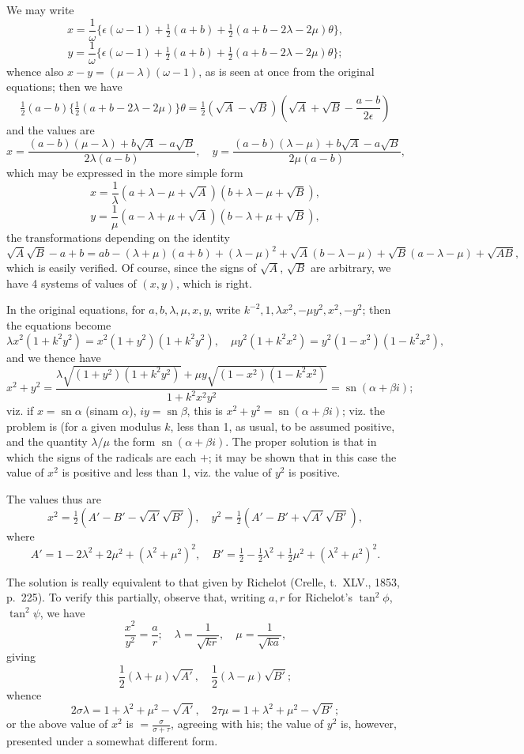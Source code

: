 \documentclass[11pt,a4paper]{book}
\begin{document}
\begin{solution}
We may write
\[
x = \frac{1}{\omega}\{\epsilon(\omega-1) + \tfrac{1}{2}(a+b) + \tfrac{1}{2}(a+b-2\lambda-2\mu)\theta\},
\]
\[
y = \frac{1}{\omega}\{\epsilon(\omega-1) + \tfrac{1}{2}(a+b) + \tfrac{1}{2}(a+b-2\lambda-2\mu)\theta\};
\]
whence also $x-y = (\mu-\lambda)(\omega-1)$, as is seen at once from the original equations; then we have
\[
\tfrac{1}{2}(a-b)\{\tfrac{1}{2}(a+b-2\lambda-2\mu)\}\theta = \tfrac{1}{2}(\sqrt{A}-\sqrt{B})(\sqrt{A}+\sqrt{B}-\frac{a-b}{2\epsilon})
\]
and the values are
\[
x = \frac{(a-b)(\mu-\lambda) + b\sqrt{A} - a\sqrt{B}}{2\lambda(a-b)}, \quad
y = \frac{(a-b)(\lambda-\mu) + b\sqrt{A} - a\sqrt{B}}{2\mu(a-b)},
\]
which may be expressed in the more simple form
\[
x = \frac{1}{\lambda}(a+\lambda-\mu+\sqrt{A})(b+\lambda-\mu+\sqrt{B}),
\]
\[
y = \frac{1}{\mu}(a-\lambda+\mu+\sqrt{A})(b-\lambda+\mu+\sqrt{B}),
\]
the transformations depending on the identity
\[
\sqrt{A}\sqrt{B} - a + b = ab - (\lambda+\mu)(a+b) + (\lambda-\mu)^2 + \sqrt{A}(b-\lambda-\mu) + \sqrt{B}(a-\lambda-\mu) + \sqrt{AB},
\]
which is easily verified. Of course, since the signs of $\sqrt{A}$, $\sqrt{B}$ are arbitrary, we have 4 systems of values of $(x,y)$, which is right.

In the original equations, for $a,b,\lambda,\mu,x,y$, write $k^{-2}, 1, \lambda x^2, -\mu y^2, x^2, -y^2$; then the equations become
\[
\lambda x^2(1+k^2y^2) = x^2(1+y^2)(1+k^2y^2), \quad
\mu y^2(1+k^2x^2) = y^2(1-x^2)(1-k^2x^2),
\]
and we thence have
\[
x^2 + y^2 = \frac{\lambda\sqrt{(1+y^2)(1+k^2y^2)} + \mu y\sqrt{(1-x^2)(1-k^2x^2)}}{1+k^2x^2y^2} = \operatorname{sn}(\alpha+\beta i);
\]
viz. if $x = \operatorname{sn}\alpha$ (sinam $\alpha$), $iy = \operatorname{sn}\beta$, this is $x^2+y^2 = \operatorname{sn}(\alpha+\beta i)$; viz. the problem is (for a given modulus $k$, less than 1, as usual, to be assumed positive, and the quantity $\lambda/\mu$ the form $\operatorname{sn}(\alpha+\beta i)$. The proper solution is that in which the signs of the radicals are each $+$; it may be shown that in this case the value of $x^2$ is positive and less than 1, viz. the value of $y^2$ is positive.

The values thus are
\[
x^2 = \tfrac{1}{2}(A'-B'-\sqrt{A'}\sqrt{B'}), \quad
y^2 = \tfrac{1}{2}(A'-B'+\sqrt{A'}\sqrt{B'}),
\]
where
\[
A' = 1 - 2\lambda^2 + 2\mu^2 + (\lambda^2+\mu^2)^2, \quad
B' = \tfrac{1}{2} - \tfrac{1}{2}\lambda^2 + \tfrac{1}{2}\mu^2 + (\lambda^2+\mu^2)^2.
\]

The solution is really equivalent to that given by Richelot (Crelle, t.~XLV., 1853, p.~225). To verify this partially, observe that, writing $a,r$ for Richelot's $\tan^2\phi$, $\tan^2\psi$, we have
\[
\frac{x^2}{y^2} = \frac{a}{r}; \quad
\lambda = \frac{1}{\sqrt{kr}}, \quad \mu = \frac{1}{\sqrt{ka}},
\]
giving
\[
\frac{1}{2}(\lambda+\mu)\sqrt{A'}, \quad
\frac{1}{2}(\lambda-\mu)\sqrt{B'};
\]
whence
\[
2\sigma\lambda = 1+\lambda^2+\mu^2-\sqrt{A'}, \quad
2\tau\mu = 1+\lambda^2+\mu^2-\sqrt{B'};
\]
or the above value of $x^2$ is $= \frac{\sigma}{\sigma+\tau}$, agreeing with his; the value of $y^2$ is, however, presented under a somewhat different form.


\end{solution}
\end{document}
